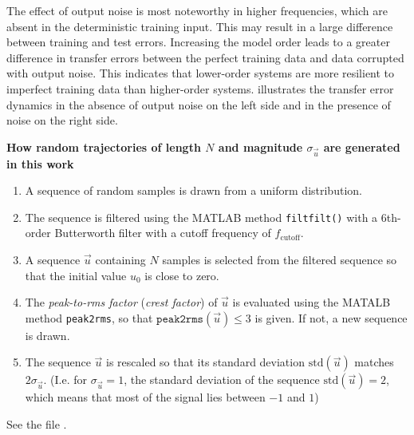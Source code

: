 The effect of output noise is most noteworthy in higher frequencies, which are absent in the deterministic training input. 
This may result in a large difference between training and test errors. Increasing the model order leads to a greater difference in transfer errors between the perfect training data and data corrupted with output noise. This indicates that lower-order systems are more resilient to imperfect training data than higher-order systems. 
 illustrates the transfer error dynamics in the absence of output noise on the left side and in the presence of noise on the right side.


\begin{notebox}\label{noteapp:sample_random_input}
	\textbf{How random trajectories of length $N$ and magnitude $\sigma_{\vec{u}}$ are generated in this work}~\\
	\vspace{-1em}
	\begin{enumerate}[noitemsep, topsep=0pt]
		\item A sequence of random samples is drawn from a uniform distribution.
		\item The sequence is filtered using the MATLAB method \texttt{filtfilt()} with a 6th-order Butterworth filter with a cutoff frequency of $f_{\mathrm{cutoff}}$.
		\item A sequence $\vec{u}$ containing $N$ samples is selected from the filtered sequence so that the initial value $u_0$ is close to zero. 
		\item The \textit{peak-to-rms factor} (\textit{crest factor}) of $\vec{u}$ is evaluated using the MATALB method \texttt{peak2rms}, so that $\texttt{peak2rms}(\vec{u}) \leq 3$ is given. If not, a new sequence is drawn. 
		\item The sequence $\vec{u}$ is rescaled so that its standard deviation $\mathrm{std}(\vec{u})$ matches 
		$2\sigma_{\vec{u}}$. (I.e. for $\sigma_{\vec{u}}=1$, the standard deviation of the sequence $\mathrm{std}(\vec{u})=2$, which means that most of the signal lies between $-1$ and $1$)
	\end{enumerate}	
	See the file .	
\end{notebox}

